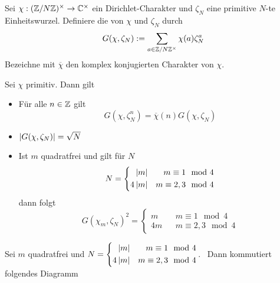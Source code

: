 \documentclass{book}
\begin{document}
Sei $\chi : (\mathbb{Z}/N\mathbb{Z})^\times \overset{}{\rightarrow} \mathbb{C}^\times$ ein Dirichlet-Charakter und $\zeta_N$ eine primitive $N$-te Einheitswurzel. Definiere die  von $\chi$ und $\zeta_N$ durch
\[ G(\chi, \zeta_N) := \sum_{a \in \mathbb{Z}/N\mathbb{Z}^\times} \chi(a) \zeta_N^a \]
Bezeichne mit $\overline{\chi}$ den komplex konjugierten Charakter von $\chi$.

\Satz{}
Sei $\chi$ primitiv. Dann gilt
\begin{itemize}
\item Für alle $n \in \mathbb{Z}$ gilt
\[G(\chi, \zeta_N^n) = \overline{\chi}(n) G(\chi, \zeta_N) \]
\item $\left|G(\chi, \zeta_N)\right| = \sqrt{N}$
\item Ist $m$ quadratfrei und gilt für $N$
\begin{align*}
N = 
\left\lbrace\begin{aligned}
\left|m\right| && m \equiv 1 \mod{4}\\
4\left|m\right| && m \equiv 2,3 \mod{4}
\end{aligned}\right.
\end{align*}
dann folgt
\[ G(\chi_m, \zeta_N)^2 = \left\lbrace
\begin{aligned}
m && m \equiv 1 \mod{4}\\
4m && m \equiv 2,3 \mod{4}
\end{aligned}
\right. \]
\end{itemize}

\Satz{}
Sei $m$ quadratfrei und $N = 
\left\lbrace\begin{aligned}
\left|m\right| && m \equiv 1 \mod{4}\\
4\left|m\right| && m \equiv 2,3 \mod{4}
\end{aligned}\right.$. \ Dann kommutiert folgendes Diagramm
\begin{center}
\end{center}
\end{document}
